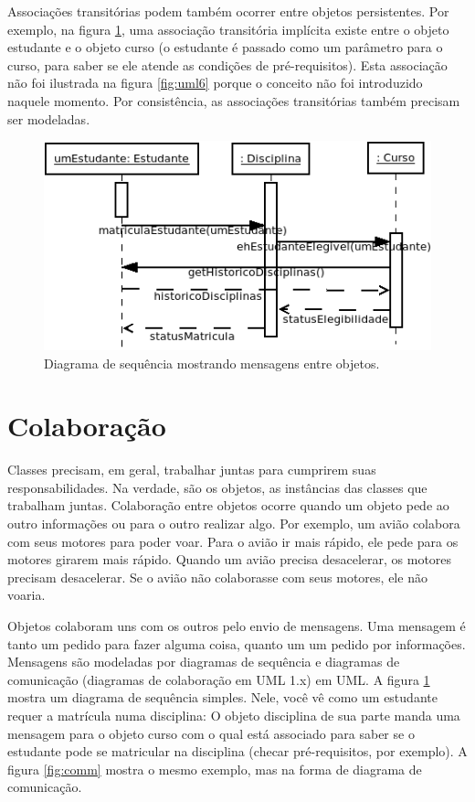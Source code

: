 Associações transitórias podem também ocorrer entre objetos persistentes. Por exemplo, na figura \ref{fig:seq}, uma associação transitória implícita
existe entre o objeto estudante e o objeto curso (o estudante é passado como um parâmetro para o curso, para saber se ele atende as condições de pré-requisitos). Esta associação não foi ilustrada na figura \ref{fig:uml6} porque o conceito não foi introduzido naquele momento. Por consistência, as associações transitórias também  precisam ser modeladas.

\begin{figure}
\begin{center}
\includegraphics[scale=0.65]{clsSeq.png}
\end{center}
\caption{Diagrama de sequência mostrando mensagens entre objetos.} \label{fig:seq}
\end{figure}

\section{Colaboração}

Classes precisam, em geral, trabalhar juntas para cumprirem suas responsabilidades. Na verdade, são os objetos, as instâncias das classes que trabalham juntas. Colaboração entre objetos ocorre quando um objeto pede ao outro informações ou para o outro realizar algo. Por exemplo, um avião colabora com seus motores para poder voar. Para o avião ir mais rápido, ele pede para os motores girarem mais rápido. Quando um avião precisa desacelerar, os motores precisam desacelerar. Se o avião não colaborasse com seus motores, ele não voaria.

Objetos colaboram uns com os outros pelo envio de mensagens. Uma mensagem é tanto um pedido para fazer alguma coisa, quanto um um pedido por informações. Mensagens são modeladas por diagramas de sequência e diagramas de comunicação (diagramas de colaboração em UML 1.x) em UML. A figura \ref{fig:seq} mostra um diagrama de sequência simples. Nele, você vê como um estudante requer a matrícula numa disciplina: O objeto disciplina de sua parte manda uma mensagem para o objeto curso com o qual está associado para saber se o estudante pode se matricular na disciplina (checar pré-requisitos, por exemplo). A figura \ref{fig:comm} mostra o mesmo exemplo, mas na forma de diagrama de comunicação.

